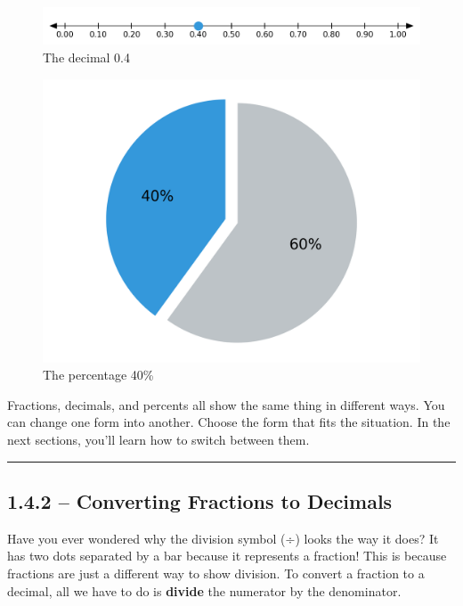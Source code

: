 \documentclass[
  letterpaper,
  DIV=11,
  numbers=noendperiod]{scrreprt}
\begin{document}
\begin{figure}[H]

{\centering \includegraphics[width=0.75\linewidth,height=\textheight,keepaspectratio]{images/Unit_1/Lesson_4/linechart_point_4.png}

}

\caption{The decimal 0.4}

\end{figure}%

\begin{figure}[H]

{\centering \includegraphics[width=0.5\linewidth,height=\textheight,keepaspectratio]{images/Unit_1/Lesson_4/pie_chart_40_percent.png}

}

\caption{The percentage 40\%}

\end{figure}%

Fractions, decimals, and percents all show the same thing in different
ways. You can change one form into another. Choose the form that fits
the situation. In the next sections, you'll learn how to switch between
them.

\begin{center}\rule{0.5\linewidth}{0.5pt}\end{center}

\subsection*{1.4.2 -- Converting Fractions to
Decimals}\label{converting-fractions-to-decimals}

Have you ever wondered why the division symbol (÷) looks the way it
does? It has two dots separated by a bar because it represents a
fraction! This is because fractions are just a different way to show
division. To convert a fraction to a decimal, all we have to do is
\textbf{divide} the numerator by the denominator.
\end{document}
